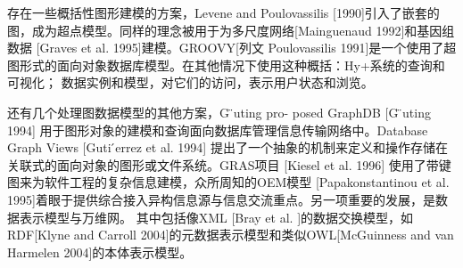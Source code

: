\documentclass[a4paper]{ecust_thesis_translation}
\begin{document}
		存在一些概括性图形建模的方案，Levene and Poulovassilis [1990]引入了嵌套的图，成为超点模型。同样的理念被用于为多尺度网络[Mainguenaud 1992]和基因组数据 [Graves et al. 1995]建模。GROOVY[列文 Poulovassilis 1991]是一个使用了超图形式的面向对象数据库模型。在其他情况下使用这种概括：Hy+系统的查询和可视化； 数据实例和模型，对它们的访问，表示用户状态和浏览。

		还有几个处理图数据模型的其他方案，G ̈uting pro- posed GraphDB [G ̈uting 1994] 用于图形对象的建模和查询面向数据库管理信息传输网络中。Database Graph Views [Guti ́errez et al. 1994] 提出了一个抽象的机制来定义和操作存储在关联式的面向对象的图形或文件系统。GRAS项目 [Kiesel et al. 1996] 使用了带键图来为软件工程的复杂信息建模，众所周知的OEM模型 [Papakonstantinou et al. 1995]着眼于提供综合接入异构信息源与信息交流重点。另一项重要的发展，是数据表示模型与万维网。 其中包括像XML [Bray et al. ]的数据交换模型，如RDF[Klyne and Carroll 2004]的元数据表示模型和类似OWL[McGuinness and van Harmelen 2004]的本体表示模型。
\end{document}
